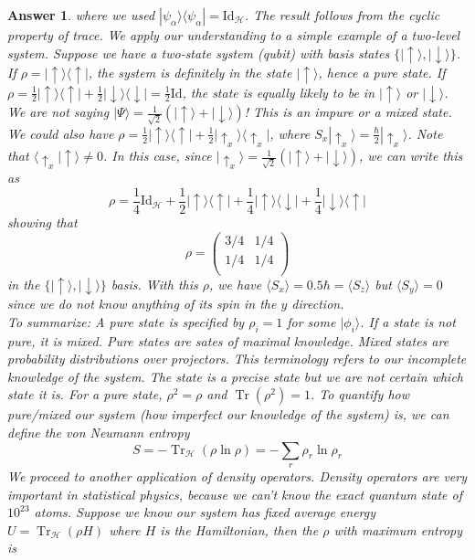\documentclass[a4paper]{article}
\DeclareMathOperator{\Tr}{Tr}
\newtheorem{ans}{Answer}[subsection]
\theoremstyle{new}
\begin{document}
\begin{ans}
where we used $|\psi_\alpha\rangle\langle\psi_\alpha|=\text{Id}_{\mathcal{H}}$. The result follows from the cyclic property of trace. We apply our understanding to a simple example of a two-level system. Suppose we have a two-state system (qubit) with basis states $\{|\uparrow\rangle,|\downarrow\rangle\}$. If $\rho=|\uparrow\rangle\langle\uparrow|$, the system is definitely in the state $|\uparrow\rangle$, hence a pure state. If $\rho=\frac{1}{2}|\uparrow\rangle\langle\uparrow|+\frac{1}{2}|\downarrow\rangle\langle\downarrow|=\frac{1}{2}\text{Id}$, the state is equally likely to be in $|\uparrow\rangle$ or $|\downarrow\rangle$. We are not saying $|\Psi\rangle=\frac{1}{\sqrt{2}}(|\uparrow\rangle+|\downarrow\rangle)$! This is an impure or a mixed state. We could also have $\rho=\frac{1}{2}|\uparrow\rangle\langle\uparrow|+\frac{1}{2}|\uparrow_x\rangle\langle\uparrow_x|$, where $S_x|\uparrow_x\rangle=\frac{\hbar}{2}|\uparrow_x\rangle$. Note that $\langle\uparrow_x|\uparrow\rangle\neq0$. In this case, since $|\uparrow_x\rangle=\frac{1}{\sqrt{2}}(|\uparrow\rangle+|\downarrow\rangle)$, we can write this as
$$\rho=\frac{1}{4}\text{Id}_{\mathcal{H}}+\frac{1}{2}|\uparrow\rangle\langle\uparrow|+\frac{1}{4}|\uparrow\rangle\langle\downarrow|+\frac{1}{4}|\downarrow\rangle\langle\uparrow|$$
showing that
$$\rho=\begin{pmatrix}3/4&1/4\\1/4&1/4\\\end{pmatrix}$$
in the $\{|\uparrow\rangle,|\downarrow\rangle\}$ basis. With this $\rho$, we have $\langle S_x\rangle=0.5\hbar=\langle S_z\rangle$ but $\langle S_y\rangle=0$ since we do not know anything of its spin in the $y$ direction.\\[5pt]
To summarize: A pure state is specified by $\rho_i=1$ for some $|\phi_i\rangle$. If a state is not pure, it is mixed. Pure states are sates of maximal knowledge. Mixed states are probability distributions over projectors. This terminology refers to our incomplete knowledge of the system. The state is a precise state but we are not certain which state it is. For a pure state, $\rho^2=\rho$ and $\Tr(\rho^2)=1$. To quantify how pure/mixed our system (how imperfect our knowledge of the system) is, we can define the von Neumann entropy 
$$S=-\Tr_{\mathcal{H}}(\rho\ln\rho)=-\sum_r\rho_r\ln\rho_r$$
We proceed to another application of density operators. Density operators are very important in statistical physics, because we can't know the exact quantum state of $10^{23}$ atoms. Suppose we know our system has fixed average energy $U=\Tr_{\mathcal{H}}(\rho H)$ where $H$ is the Hamiltonian, then the $\rho$ with maximum entropy is 

\end{ans}
\end{document}
